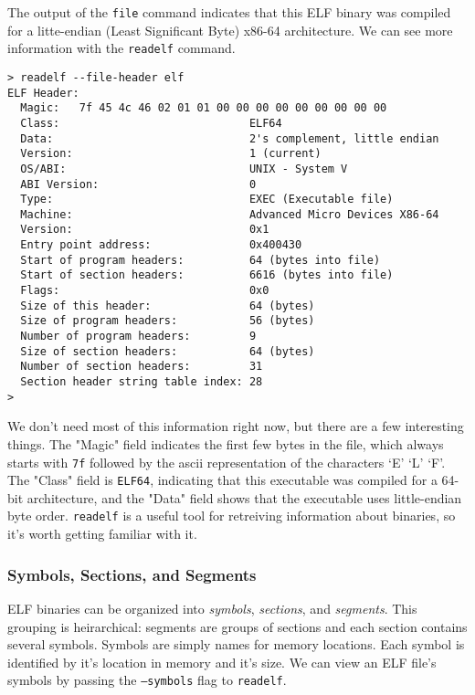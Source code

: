 The output of the \texttt{file} command indicates that this ELF binary was
compiled for a litte-endian (Least Significant Byte) x86-64 architecture. We can
see more information with the \texttt{readelf} command.

\begin{lstlisting}
> readelf --file-header elf
ELF Header:
  Magic:   7f 45 4c 46 02 01 01 00 00 00 00 00 00 00 00 00 
  Class:                             ELF64
  Data:                              2's complement, little endian
  Version:                           1 (current)
  OS/ABI:                            UNIX - System V
  ABI Version:                       0
  Type:                              EXEC (Executable file)
  Machine:                           Advanced Micro Devices X86-64
  Version:                           0x1
  Entry point address:               0x400430
  Start of program headers:          64 (bytes into file)
  Start of section headers:          6616 (bytes into file)
  Flags:                             0x0
  Size of this header:               64 (bytes)
  Size of program headers:           56 (bytes)
  Number of program headers:         9
  Size of section headers:           64 (bytes)
  Number of section headers:         31
  Section header string table index: 28
> 
\end{lstlisting}

We don't need most of this information right now, but there are a few
interesting things. The "Magic" field indicates the first few bytes in the file,
which always starts with \texttt{7f} followed by the ascii representation of the
characters `E' `L' `F'. The "Class" field is \texttt{ELF64}, indicating that
this executable was compiled for a 64-bit architecture, and the "Data" field
shows that the executable uses little-endian byte order. \texttt{readelf} is a
useful tool for retreiving information about binaries, so it's worth getting
familiar with it.

\subsubsection{Symbols, Sections, and Segments}
ELF binaries can be organized into \emph{symbols}, \emph{sections}, and
\emph{segments}. This grouping is heirarchical: segments are groups of sections
and each section contains several symbols. Symbols are simply names for memory
locations. Each symbol is identified by it's location in memory and it's size.
We can view an ELF file's symbols by passing the \texttt{--symbols} flag to
\texttt{readelf}.

